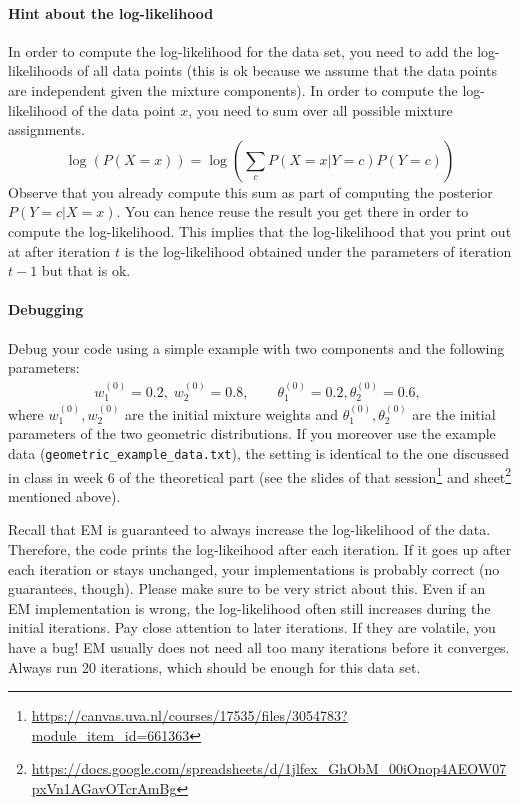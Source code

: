 \documentclass[11pt, a4paper]{article}
\begin{document}
\paragraph{Hint about the log-likelihood} 
In order to compute the log-likelihood for the data set, you need to add the log-likelihoods of all data points (this is
ok because we assume that the data points are independent given the mixture components). In order to compute the log-likelihood of the data point $ x $, you need
to sum over all possible mixture assignments.
\begin{equation}
\log(P(X=x)) = \log\left(\sum_{c} P(X=x|Y=c) P(Y=c)\right)
\end{equation}
Observe that you already compute this sum as part of computing the posterior $ P(Y=c|X=x) $. You can hence reuse the result you get there in order to compute the 
log-likelihood. This implies that the log-likelihood that you print out at after iteration $ t $ is the log-likelihood obtained under the parameters of iteration
$ t-1 $ but that is ok.


\paragraph{Debugging}

Debug your code using a simple example with two components and the following parameters:
\begin{align}
  w_1^{(0)} = 0.2, \; w_2^{(0)} = 0.8, \qquad \theta_1^{(0)} = 0.2, \theta_2^{(0)} = 0.6,\;
\end{align}
where $w_1^{(0)}, w_2^{(0)}$ are the initial mixture weights and $\theta_1^{(0)}, \theta_2^{(0)}$ are the initial parameters of the two geometric distributions.
If you moreover use the example data (\texttt{geometric\_example\_data.txt}), the setting is identical to the one discussed in class in week 6 of the theoretical part (see the slides of that session\footnote{\href{https://canvas.uva.nl/courses/17535/files/3054783?module_item_id=661363}{https://canvas.uva.nl/courses/17535/files/3054783?module\_item\_id=661363}} and  sheet\footnote{\href{https://docs.google.com/spreadsheets/d/1jlfex_GhObM_00iOnop4AEOW07pxVn1AGavOTcrAmBg}{https://docs.google.com/spreadsheets/d/1jlfex\_GhObM\_00iOnop4AEOW07pxVn1AGavOTcrAmBg}} mentioned above).


Recall that EM is guaranteed to always increase the log-likelihood of the data. Therefore, the code prints the log-likeihood after each iteration.
If it goes up after each iteration or stays unchanged, your implementations is probably correct (no guarantees, though). Please make sure to be very strict about
this. Even if an EM implementation is wrong, the log-likelihood often still increases during the initial iterations. Pay close attention to later iterations. If they
are volatile, you have a bug! EM usually does not need all too many iterations before it converges. Always run 20 iterations, which should be enough for 
this data set.
\end{document}

